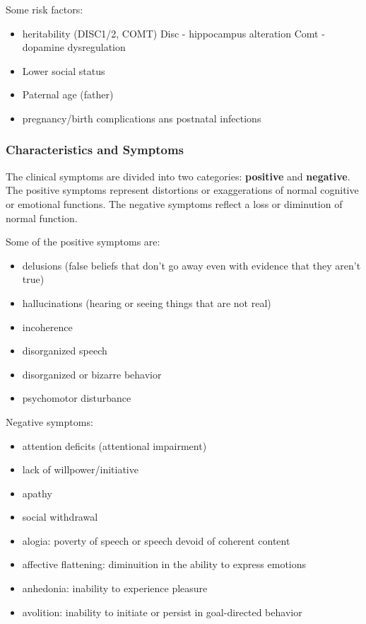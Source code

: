 \documentclass[12pt,article,oneside,a4paper]{memoir}
\begin{document}
Some risk factors:
\begin{itemize}
\item heritability (DISC1/2, COMT)
\subitem Disc - hippocampus alteration
\subitem Comt - dopamine dysregulation
\item Lower social status
\item Paternal age (father)
\item pregnancy/birth complications ans postnatal infections
\end{itemize}

\subsubsection{Characteristics and Symptoms}

The clinical symptoms are divided into two categories: \textbf{positive} and
\textbf{negative}. The positive symptoms represent distortions or exaggerations
of normal cognitive or emotional functions. The negative symptoms reflect a
loss or diminution of normal function.

Some of the positive symptoms are:
\begin{itemize}
\item delusions (false beliefs that don't go away even with evidence that they
aren't true)
\item hallucinations (hearing or seeing things that are not real)
\item incoherence
\item disorganized speech
\item disorganized or bizarre behavior
\item psychomotor disturbance
\end{itemize}

Negative symptoms:
\begin{itemize}
\item attention deficits (attentional impairment)
\item lack of willpower/initiative
\item apathy
\item social withdrawal
\item alogia: poverty of speech or speech devoid of coherent content
\item affective flattening: diminuition in the ability to express emotions
\item anhedonia: inability to experience pleasure
\item avolition: inability to initiate or persist in goal-directed behavior
\end{itemize}
\end{document}
